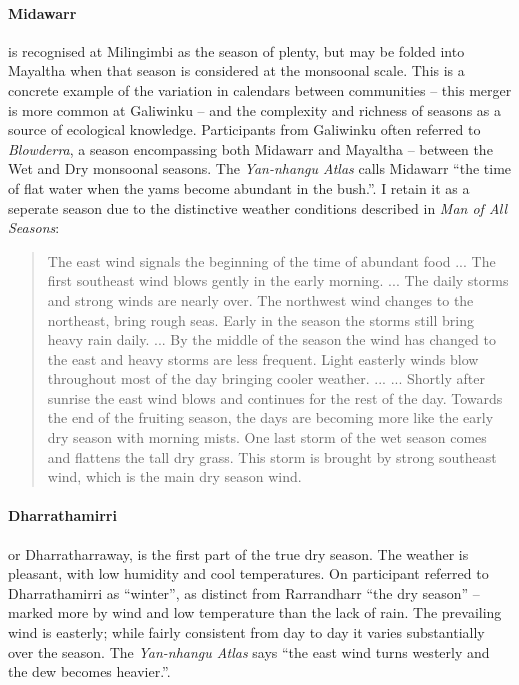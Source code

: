 \paragraph{Midawarr} is recognised at Milingimbi as the season of plenty,
but may be folded into Mayaltha when that season is considered at the
monsoonal scale.  This is a concrete example of the variation in calendars
between communities -- this merger is more common at Galiwinku -- and the
complexity and richness of seasons as a source of ecological knowledge.
%
Participants from Galiwinku often referred to \textit{Blowderra}, a season
encompassing both Midawarr and Mayaltha -- between the Wet and Dry monsoonal
seasons.  The \textit{Yan-nhangu Atlas} calls Midawarr ``the time of flat
water when the yams become abundant in the bush.''. I retain it as a
seperate season due to the distinctive weather conditions described in
\textit{Man of All Seasons}:
\begin{quote}
    The east wind signals the beginning of the time of abundant food ...
    The first southeast wind blows gently in the early morning. ...
    The daily storms and strong winds are nearly over.
    The northwest wind changes to the northeast, bring rough seas.
    Early in the season the storms still bring heavy rain daily.
    ...
    By the middle of the season the wind has changed to the east and
    heavy storms are less frequent.  Light easterly winds blow
    throughout most of the day bringing cooler weather. ...
    ...
    Shortly after sunrise the east wind blows and continues for the
    rest of the day.  Towards the end of the fruiting season, the days
    are becoming  more like the early dry season with morning mists.
    One last storm of the wet season comes and flattens the tall dry grass.
    This storm is brought by strong southeast wind, which is the main dry season wind.
\end{quote}


\paragraph{Dharrathamirri} or Dharratharraway, is the first part of the
true dry season.  The weather is pleasant, with low humidity and cool
temperatures.  On participant referred to Dharrathamirri as ``winter'',
as distinct from Rarrandharr ``the dry season'' -- marked more by wind
and low temperature than the lack of rain.
%
The prevailing wind is easterly; while fairly consistent from day to day
it varies substantially over the season.  The \textit{Yan-nhangu Atlas}
says ``the east wind turns westerly and the dew becomes heavier.''.

